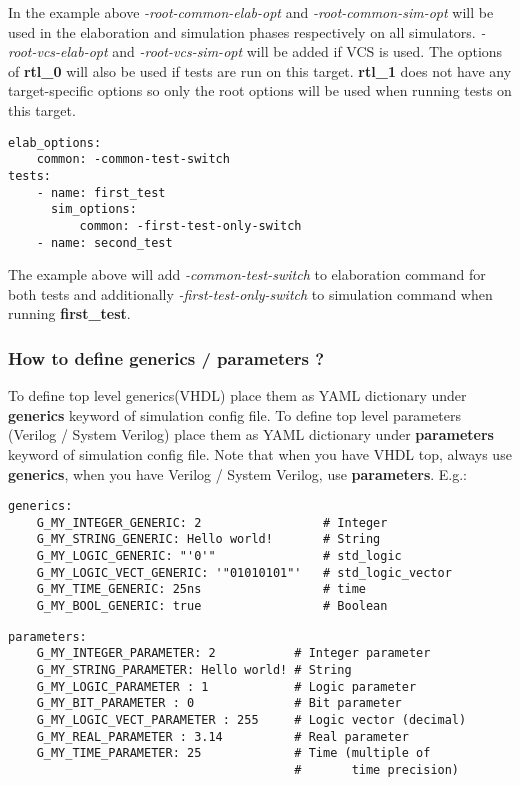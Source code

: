 \documentclass{tropic_design_spec}
\begin{document}
In the example above \textit{-root-common-elab-opt} and \textit{-root-common-sim-opt}
will be used in the elaboration and simulation phases respectively on all simulators.
\textit{-root-vcs-elab-opt} and \textit{-root-vcs-sim-opt} will be added if VCS is used.
The options of \textbf{rtl_0} will also be used if tests are run on this target.
\textbf{rtl_1} does not have any target-specific options so only the root options
will be used when running tests on this target.

\begin{lstlisting}
elab_options:
    common: -common-test-switch
tests:
    - name: first_test
      sim_options:
          common: -first-test-only-switch
    - name: second_test
\end{lstlisting}

The example above will add \textit{-common-test-switch} to elaboration command for
both tests and additionally \textit{-first-test-only-switch} to simulation command
when running \textbf{first_test}.


\subsubsection{How to define generics / parameters ?}
\label{sec:how-to-define-generics-parameters}

To define top level generics(VHDL) place them as YAML dictionary under \textbf{generics}
keyword of simulation config file. To define top level parameters (Verilog / System Verilog)
place them as YAML dictionary under \textbf{parameters} keyword of simulation config file.
Note that when you have VHDL top, always use \textbf{generics}, when you have Verilog /
System Verilog, use \textbf{parameters}. E.g.:

\begin{lstlisting}
generics:
    G_MY_INTEGER_GENERIC: 2                 # Integer
    G_MY_STRING_GENERIC: Hello world!       # String
    G_MY_LOGIC_GENERIC: "'0'"               # std_logic
    G_MY_LOGIC_VECT_GENERIC: '"01010101"'   # std_logic_vector
    G_MY_TIME_GENERIC: 25ns                 # time
    G_MY_BOOL_GENERIC: true                 # Boolean
\end{lstlisting}

\begin{lstlisting}
parameters:
    G_MY_INTEGER_PARAMETER: 2           # Integer parameter
    G_MY_STRING_PARAMETER: Hello world! # String
    G_MY_LOGIC_PARAMETER : 1            # Logic parameter
    G_MY_BIT_PARAMETER : 0              # Bit parameter
    G_MY_LOGIC_VECT_PARAMETER : 255     # Logic vector (decimal)
    G_MY_REAL_PARAMETER : 3.14          # Real parameter
    G_MY_TIME_PARAMETER: 25             # Time (multiple of
                                        #       time precision)
\end{lstlisting}
\end{document}
